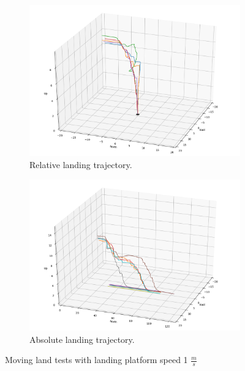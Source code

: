 
\begin{figure}[ht]
    \centering
    \begin{subfigure}[b]{0.49\textwidth}
        \centering
        \includegraphics[width=\textwidth]{images/moving_land_testing_1mps.png}
        \caption{Relative landing trajectory.}
        \label{subfig:moving_land_testing_1mps_relative}
    \end{subfigure}
    \begin{subfigure}[b]{0.49\textwidth}
        \centering
        \includegraphics[width=\textwidth]{images/moving_land_testing_1mps_absolute.png}
        \caption{Absolute landing trajectory.}
        \label{subfig:moving_land_testing_1mps_absolute}
    \end{subfigure}
    \caption{Moving land tests with landing platform speed 1 $\frac{m}{s}$}
    \label{fig:moving_land_testing_1mps}
\end{figure}

